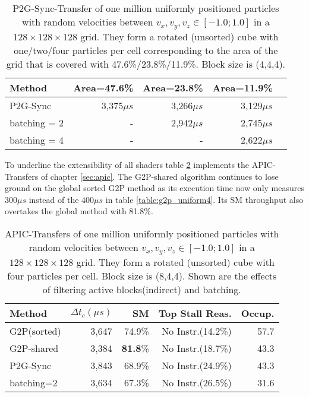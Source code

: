 \documentclass[m,times]{cgMA}
\begin{document}
\begin{table}[htpb]
  \begin{tabular}{ | l | r | r | r | r |}    \hline
    Method                 &  Area=47.6\% & Area=23.8\% &Area=11.9\%\\\hline
    P2G-Sync		   &  3,375$\mu s$& 3,266$\mu s$ & 3,129$\mu s$\\\hline
    batching = 2           & -&2,942$\mu s$ & 2,745$\mu s$\\\hline
    batching = 4           & -&- &2,622$\mu s$\\\hline
 \end{tabular}
 \caption{P2G-Sync-Transfer of one million uniformly positioned particles with random velocities between $v_x,v_y,v_z \in [-1.0;1.0]$ in a $128\times 128\times128$ grid. They form a rotated (unsorted) cube with one/two/four particles per cell corresponding to the area of the grid that is covered with 47.6\%/23.8\%/11.9\%. Block size is (4,4,4).}
 \label{table:p2g_area}
\end{table}
To underline the extensibility of all shaders table \ref{table:apic} implements the APIC-Transfers of chapter \ref{sec:apic}. The G2P-shared algorithm continues to lose ground on the global sorted G2P method as its execution time now only measures $300\mu s$ instead of the $400\mu s$ in table \ref{table:g2p_uniform4}. Its SM throughput also overtakes the global method with 81.8\%.
\begin{table}[htpb]
  \begin{tabular}{ | l | r | r | r | r |}    \hline
    Method                 &  $\Delta t_c(\mu s)$ &SM    & Top Stall Reas.  & Occup.\\\hline
    G2P(sorted)		   &    3,647             &74.9\%&No Instr.(14.2\%)& 57.7\\\hline
    G2P-shared             &    3,384             &\textbf{81.8}\%&No Instr.(18.7\%) & 43.3\\\hline
    \hline
    P2G-Sync               &    3,843             &68.9\%&No Instr.(24.9\%) & 43.3\\\hline
    batching=2             &    3,634             &67.3\%&No Instr.(26.5\%) & 31.6\\\hline
 \end{tabular}
 \caption{APIC-Transfers of one million uniformly positioned particles with random velocities between $v_x,v_y,v_z \in [-1.0;1.0]$ in a $128\times 128\times128$ grid. They form a rotated (unsorted) cube with four particles per cell. Block size is (8,4,4). Shown are the effects of filtering active blocks(indirect) and batching.}\label{table:apic}
\end{table}
\end{document}
